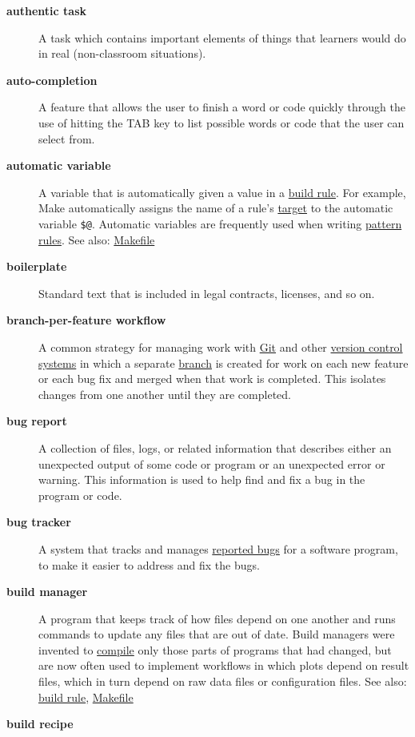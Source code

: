 \documentclass[
]{krantz}
\begin{document}
\begin{description}
\item[\textbf{authentic task}]
A task which contains important elements of things that learners would do in real (non-classroom situations).
\item[\textbf{auto-completion}]
A feature that allows the user to finish a word or code quickly through the use of hitting the TAB key to list possible words or code that the user can select from.
\item[\textbf{automatic variable}]
A variable that is automatically given a value in a \protect\hyperlink{build_rule}{build rule}. For example, Make automatically assigns the name of a rule's \protect\hyperlink{build_target}{target} to the automatic variable \texttt{\$@}. Automatic variables are frequently used when writing \protect\hyperlink{pattern_rule}{pattern rules}. See also: \protect\hyperlink{makefile}{Makefile}
\item[\textbf{boilerplate}]
Standard text that is included in legal contracts, licenses, and so on.
\item[\textbf{branch-per-feature workflow}]
A common strategy for managing work with \protect\hyperlink{git}{Git} and other \protect\hyperlink{version_control_system}{version control systems} in which a separate \protect\hyperlink{git_branch}{branch} is created for work on each new feature or each bug fix and merged when that work is completed. This isolates changes from one another until they are completed.
\item[\textbf{bug report}]
A collection of files, logs, or related information that describes either an unexpected output of some code or program or an unexpected error or warning. This information is used to help find and fix a bug in the program or code.
\item[\textbf{bug tracker}]
A system that tracks and manages \protect\hyperlink{bug_report}{reported bugs} for a software program, to make it easier to address and fix the bugs.
\item[\textbf{build manager}]
A program that keeps track of how files depend on one another and runs commands to update any files that are out of date. Build managers were invented to \protect\hyperlink{compile}{compile} only those parts of programs that had changed, but are now often used to implement workflows in which plots depend on result files, which in turn depend on raw data files or configuration files. See also: \protect\hyperlink{build_rule}{build rule}, \protect\hyperlink{makefile}{Makefile}
\item[\textbf{build recipe}]

\end{description}
\end{document}
